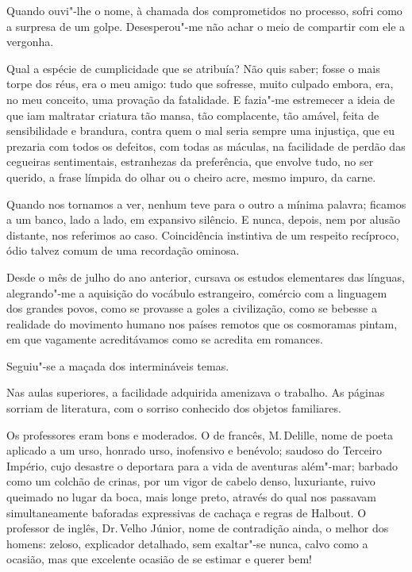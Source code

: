 Quando ouvi"-lhe o nome, à chamada dos
comprometidos no processo, sofri como a surpresa de um golpe.
Desesperou"-me não achar o meio de compartir com ele a vergonha. 

Qual a espécie de cumplicidade que se atribuía? Não quis saber; fosse o mais
torpe dos réus, era o meu amigo: tudo que sofresse, muito culpado
embora, era, no meu conceito, uma provação da fatalidade. E fazia"-me
estremecer a ideia de que iam maltratar criatura tão mansa, tão
complacente, tão amável, feita de sensibilidade e brandura, contra quem
o mal seria sempre uma injustiça, que eu prezaria com todos os
defeitos, com todas as máculas, na facilidade de perdão das cegueiras
sentimentais, estranhezas da preferência, que envolve tudo, no ser
querido, a frase límpida do olhar ou o cheiro acre, mesmo impuro, da
carne. 

Quando nos tornamos a ver, nenhum teve para o outro a mínima
palavra; ficamos a um banco, lado a lado, em expansivo silêncio. E
nunca, depois, nem por alusão distante, nos referimos ao caso.
Coincidência instintiva de um respeito recíproco, ódio talvez comum de
uma recordação ominosa. 

Desde o mês de julho do ano anterior, cursava
os estudos elementares das línguas, alegrando"-me a aquisição do
vocábulo estrangeiro, comércio com a linguagem dos grandes povos, como
se provasse a goles a civilização, como se bebesse a realidade do
movimento humano nos países remotos que os cosmoramas pintam, em que
vagamente acreditávamos como se acredita em romances. 

Seguiu"-se a maçada dos intermináveis temas. 

Nas aulas superiores, a facilidade
adquirida amenizava o trabalho. As páginas sorriam de literatura, com o
sorriso conhecido dos objetos familiares.

Os professores eram bons e moderados. O de francês, M.\,Delille, nome de
poeta aplicado a um urso, honrado urso, inofensivo e benévolo; saudoso
do Terceiro Império, cujo desastre o deportara para a vida de aventuras
além"-mar; barbado como um colchão de crinas, por um vigor de cabelo
denso, luxuriante, ruivo queimado no lugar da boca, mais longe preto,
através do qual nos passavam simultaneamente baforadas expressivas de
cachaça e regras de Halbout. O professor de inglês, Dr.\,Velho Júnior,
nome de contradição ainda, o melhor dos homens: zeloso, explicador
detalhado, sem exaltar"-se nunca, calvo como a ocasião, mas que
excelente ocasião de se estimar e querer bem! 


